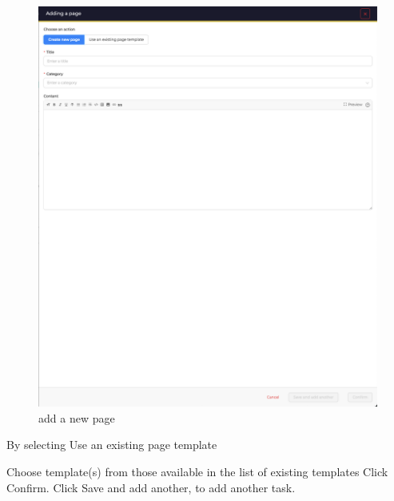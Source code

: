 \begin{figure}[H]
    \centering
    \includegraphics[width=\textwidth]{images/docs/analyst/cases/addition/adding_a_new_page.png}
    \caption{add a new page}
    \label{fig:modules}
\end{figure}

By selecting Use an existing page template

Choose template(s) from those available in the list of existing templates
Click Confirm.
Click Save and add another, to add another task.

